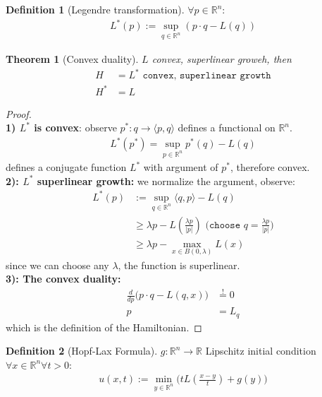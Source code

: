 \documentclass[a4paper,11pt,oneside,fleqn]{book}
\newtheorem{theorem}{Theorem}[section]
\theoremstyle{definition}
\newtheorem{definition}{Definition}[section]
\theoremstyle{remark}
\begin{document}
\begin{definition}[Legendre transformation]
	$\forall p \in \mathbb{R}^n$:
	\begin{align*}
		L^*(p):= \sup_{q \in \mathbb{R}^n} (p\cdot q - L(q))
	\end{align*}
\end{definition}

\begin{theorem}[Convex duality]
	$L$ convex, superlinear groweh, then
	\begin{align*}
		H&= L^* \texttt{ convex, superlinear growth}\\
		H^* &= L
	\end{align*}
\end{theorem}
\begin{proof}\quad\\
\textbf{1) $L^*$ is convex}: observe $p^*: q \rightarrow \langle p, q \rangle$ defines a functional on $\mathbb{R}^n$. 
\begin{align*}
	L^*(p^*) = \sup_{p \in \mathbb{R}^n} p^*(q) - L(q)
\end{align*}
	defines a conjugate function $L^*$ with argument of $p^*$, therefore convex. \\
\textbf{2): $L^*$ superlinear growth:} we normalize the argument, observe:
\begin{align*}
	L^*(p) &:= \sup_{q \in \mathbb{R}^n} \langle q, p \rangle - L(q)\\
	&\ge \lambda p - L(\frac{\lambda p}{|p|})   \texttt{ (choose $q = \frac{\lambda p}{|p|}$)}\\
	&\ge \lambda p - \max_{x \in B(0, \lambda)} L(x) 
\end{align*}
since we can choose any $\lambda$, the function is superlinear.\\
\textbf{3): The convex duality:} 
\begin{align*}
	\frac{d}{dp}\bigg( p \cdot q - L(q, x)\bigg) &\overset{!}{=} 0\\
	p &= L_q
\end{align*}
which is the definition of the Hamiltonian. 
\end{proof}

\begin{definition}[Hopf-Lax Formula]
	$g: \mathbb{R}^n \rightarrow \mathbb{R}$ Lipschitz initial condition 
	$\forall x \in \mathbb{R}^n \forall t >  0$:
	\begin{align*}
		u(x, t):= \min_{y \in \mathbb{R}^n} \bigg(t L(\frac{x - y}{t}) + g(y)\bigg)
	\end{align*}
\end{definition}
\end{document}
